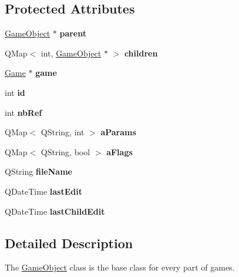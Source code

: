 \subsection*{Protected Attributes}
\begin{DoxyCompactItemize}
\item 
\hypertarget{class_game_object_a4113a496ed45ca90756cfa0d8dfe6171}{}\label{class_game_object_a4113a496ed45ca90756cfa0d8dfe6171} 
\hyperlink{class_game_object}{Game\+Object} $\ast$ {\bfseries parent}
\item 
\hypertarget{class_game_object_a096e6989277570032586b162e5802181}{}\label{class_game_object_a096e6989277570032586b162e5802181} 
Q\+Map$<$ int, \hyperlink{class_game_object}{Game\+Object} $\ast$ $>$ {\bfseries children}
\item 
\hypertarget{class_game_object_a338ed91d0ad6aebe8a8d3adf8c75752b}{}\label{class_game_object_a338ed91d0ad6aebe8a8d3adf8c75752b} 
\hyperlink{class_game}{Game} $\ast$ {\bfseries game}
\item 
\hypertarget{class_game_object_a98291c60da12d9036e1ad24cfebcf6b3}{}\label{class_game_object_a98291c60da12d9036e1ad24cfebcf6b3} 
int {\bfseries id}
\item 
\hypertarget{class_game_object_a1873810f18db1e1faecc04e0ab92c512}{}\label{class_game_object_a1873810f18db1e1faecc04e0ab92c512} 
int {\bfseries nb\+Ref}
\item 
\hypertarget{class_game_object_ab5ed36754a777ef648dd6831c0b1d6fb}{}\label{class_game_object_ab5ed36754a777ef648dd6831c0b1d6fb} 
Q\+Map$<$ Q\+String, int $>$ {\bfseries a\+Params}
\item 
\hypertarget{class_game_object_ade46e4f590a01cab331d12d0da644625}{}\label{class_game_object_ade46e4f590a01cab331d12d0da644625} 
Q\+Map$<$ Q\+String, bool $>$ {\bfseries a\+Flags}
\item 
\hypertarget{class_game_object_a8e62a0d6755b2930090348622f482f6d}{}\label{class_game_object_a8e62a0d6755b2930090348622f482f6d} 
Q\+String {\bfseries file\+Name}
\item 
\hypertarget{class_game_object_ac1a61f57d5a318b86c4f2bbb4dbde78f}{}\label{class_game_object_ac1a61f57d5a318b86c4f2bbb4dbde78f} 
Q\+Date\+Time {\bfseries last\+Edit}
\item 
\hypertarget{class_game_object_ae0a43c76fc9171015b43d008b5ffcbfd}{}\label{class_game_object_ae0a43c76fc9171015b43d008b5ffcbfd} 
Q\+Date\+Time {\bfseries last\+Child\+Edit}
\end{DoxyCompactItemize}


\subsection{Detailed Description}
The \hyperlink{class_game_object}{Game\+Object} class is the base class for every part of games. 

